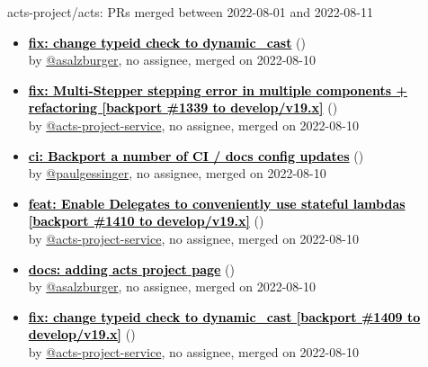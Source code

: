 \begin{frame}[allowframebreaks]{ acts-project/acts: PRs merged 
between 2022-08-01 and 2022-08-11
}
\begin{itemize}
    \item\prmerged\textbf{\href{https://github.com/acts-project/acts/pull/1409}{\textcolor{black}{fix: change typeid check to dynamic\_cast}}}
    (\href{https://github.com/acts-project/acts/pull/1409}{}) \\
    by \href{https://github.com/asalzburger}{@asalzburger}, {}no assignee, merged on 2022-08-10

    \item\prmerged\textbf{\href{https://github.com/acts-project/acts/pull/1382}{\textcolor{black}{fix: Multi-Stepper stepping error in multiple components + refactoring [backport \#1339 to develop/v19.x]}}}
    (\href{https://github.com/acts-project/acts/pull/1382}{}) \\
    by \href{https://github.com/acts-project-service}{@acts-project-service}, {}no assignee, merged on 2022-08-10

    \item\prmerged\textbf{\href{https://github.com/acts-project/acts/pull/1415}{\textcolor{black}{ci: Backport a number of CI / docs config updates}}}
    (\href{https://github.com/acts-project/acts/pull/1415}{}) \\
    by \href{https://github.com/paulgessinger}{@paulgessinger}, {}no assignee, merged on 2022-08-10

    \item\prmerged\textbf{\href{https://github.com/acts-project/acts/pull/1414}{\textcolor{black}{feat: Enable Delegates to conveniently use stateful lambdas [backport \#1410 to develop/v19.x]}}}
    (\href{https://github.com/acts-project/acts/pull/1414}{}) \\
    by \href{https://github.com/acts-project-service}{@acts-project-service}, {}no assignee, merged on 2022-08-10

    \item\prmerged\textbf{\href{https://github.com/acts-project/acts/pull/1392}{\textcolor{black}{docs: adding acts project page}}}
    (\href{https://github.com/acts-project/acts/pull/1392}{}) \\
    by \href{https://github.com/asalzburger}{@asalzburger}, {}no assignee, merged on 2022-08-10

    \item\prmerged\textbf{\href{https://github.com/acts-project/acts/pull/1413}{\textcolor{black}{fix: change typeid check to dynamic\_cast [backport \#1409 to develop/v19.x]}}}
    (\href{https://github.com/acts-project/acts/pull/1413}{}) \\
    by \href{https://github.com/acts-project-service}{@acts-project-service}, {}no assignee, merged on 2022-08-10


\end{itemize}
\end{frame}
